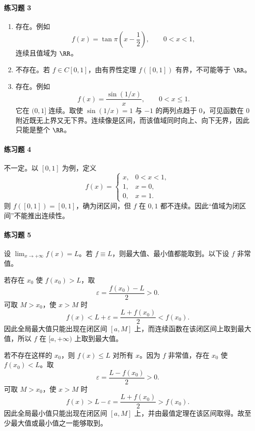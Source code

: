 \paragraph{练习题 3}
\begin{xsolution}
\begin{enumerate}[label=(\arabic*)]
 \item 存在。例如
 \[
  f(x)=\tan\pi\left(x-\frac12\right),\qquad 0<x<1,
 \]
 连续且值域为 $\RR$。

 \item 不存在。若 $f\in C[0,1]$，由有界性定理 $f([0,1])$ 有界，不可能等于 $\RR$。

 \item 存在。例如
 \[
  f(x)=\frac{\sin(1/x)}x,\qquad 0<x\le1.
 \]
 它在 $(0,1]$ 连续。取使 $\sin(1/x)=1$ 与 $-1$ 的两列点趋于 $0$，可见函数在 $0$ 附近既无上界又无下界。连续像是区间，而该值域同时向上、向下无界，因此只能是整个 $\RR$。
\end{enumerate}
\end{xsolution}

\paragraph{练习题 4}
\begin{xsolution}
不一定。以 $[0,1]$ 为例，定义
\[
 f(x)=\begin{cases}
  x,&0<x<1,\\
  1,&x=0,\\
  0,&x=1.
 \end{cases}
\]
则 $f([0,1])=[0,1]$，确为闭区间，但 $f$ 在 $0,1$ 都不连续。因此“值域为闭区间”不能推出连续性。
\end{xsolution}

\paragraph{练习题 5}
\begin{xsolution}
设 $\lim_{x\to+\infty}f(x)=L$。若 $f\equiv L$，则最大值、最小值都能取到。以下设 $f$ 非常值。

若存在 $x_0$ 使 $f(x_0)>L$，取
\[
 \varepsilon=\frac{f(x_0)-L}{2}>0.
\]
可取 $M>x_0$，使 $x>M$ 时
\[
 f(x)<L+\varepsilon=\frac{L+f(x_0)}2<f(x_0).
\]
因此全局最大值只能出现在闭区间 $[a,M]$ 上，而连续函数在该闭区间上取到最大值，所以 $f$ 在 $[a,+\infty)$ 上取到最大值。

若不存在这样的 $x_0$，则 $f(x)\le L$ 对所有 $x$。因为 $f$ 非常值，存在 $x_0$ 使 $f(x_0)<L$。取
\[
 \varepsilon=\frac{L-f(x_0)}2>0.
\]
可取 $M>x_0$，使 $x>M$ 时
\[
 f(x)>L-\varepsilon=\frac{L+f(x_0)}2>f(x_0).
\]
因此全局最小值只能出现在闭区间 $[a,M]$ 上，并由最值定理在该区间取得。故至少最大值或最小值之一能够取到。
\end{xsolution}

